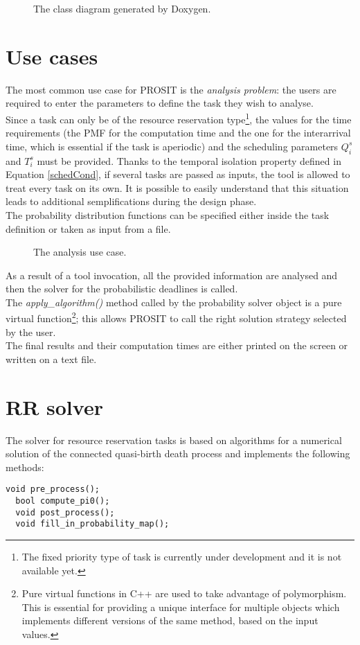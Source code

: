 \begin{figure}[H]
  \caption{The class diagram generated by Doxygen.}
  \label{automaton}
\end{figure}

\section{Use cases}
The most common use case for PROSIT is the \emph{analysis problem}: the users are required to enter the parameters to define the task they wish to analyse.\\
Since a task can only be of  the resource reservation type\footnote{The fixed priority type of task is currently under development and it is not available yet.}, the values for the time requirements (the PMF for the computation time and the one for the interarrival time, which is essential if the task is aperiodic) and the scheduling parameters \( Q_{i}^s \) and \( T_{i}^s \) must be provided. Thanks to the temporal isolation property defined in Equation \ref{schedCond}, if several tasks are passed as inputs, the tool is allowed to treat every task on its own. It is possible to easily understand that this situation leads to additional semplifications during the design phase.\\ 
The probability distribution functions can be specified either inside the task definition or taken as input from a file.
\begin{figure}[H]
  \caption{The analysis use case.}
  \label{usecase}
\end{figure}

As a result of a tool invocation, all the provided information are analysed and then the solver for the probabilistic deadlines is called.\\ 
The \emph{apply\_algorithm()} method called by the probability solver object is a pure virtual function\footnote{Pure virtual functions in C++ are used to take advantage of polymorphism. This is essential for providing a unique interface for multiple objects which implements different versions of the same method, based on the input values.}; this allows PROSIT to call the right solution strategy selected by the user.\\
The final results and their computation times are either printed on the screen or written on a text file.

\section{RR solver}
The solver for resource reservation tasks is based on algorithms for a numerical solution of the connected quasi-birth death process and implements the following methods:
\begin{lstlisting}[frame=bt]
  void pre_process();
  bool compute_pi0();
  void post_process();
  void fill_in_probability_map();
\end{lstlisting}

